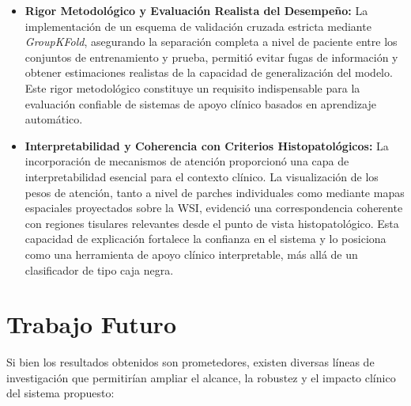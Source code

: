 \begin{itemize}
    \item \textbf{Rigor Metodológico y Evaluación Realista del Desempeño:}  
    La implementación de un esquema de validación cruzada estricta mediante \textit{GroupKFold}, asegurando la separación completa a nivel de paciente entre los conjuntos de entrenamiento y prueba, permitió evitar fugas de información y obtener estimaciones realistas de la capacidad de generalización del modelo. Este rigor metodológico constituye un requisito indispensable para la evaluación confiable de sistemas de apoyo clínico basados en aprendizaje automático.

    \item \textbf{Interpretabilidad y Coherencia con Criterios Histopatológicos:}  
    La incorporación de mecanismos de atención proporcionó una capa de interpretabilidad esencial para el contexto clínico. La visualización de los pesos de atención, tanto a nivel de parches individuales como mediante mapas espaciales proyectados sobre la WSI, evidenció una correspondencia coherente con regiones tisulares relevantes desde el punto de vista histopatológico. Esta capacidad de explicación fortalece la confianza en el sistema y lo posiciona como una herramienta de apoyo clínico interpretable, más allá de un clasificador de tipo caja negra.

\end{itemize}

\section{Trabajo Futuro}

Si bien los resultados obtenidos son prometedores, existen diversas líneas de investigación que permitirían ampliar el alcance, la robustez y el impacto clínico del sistema propuesto:

